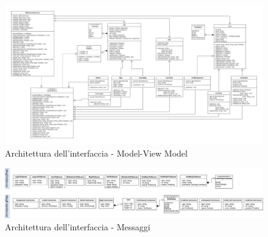 	\begin{landscape}
		\begin{figure}[h!]
			\includegraphics[width=24cm]{img/ui_component.png}
			\caption{Architettura dell'interfaccia - Model-View Model}
		\end{figure}
	\end{landscape}
	\newpage
	
	\begin{landscape}
		\begin{figure}[h!]
			\includegraphics[width=24cm]{img/ui_messaggi.png}
			\caption{Architettura dell'interfaccia - Messaggi}
		\end{figure}
	\end{landscape}


